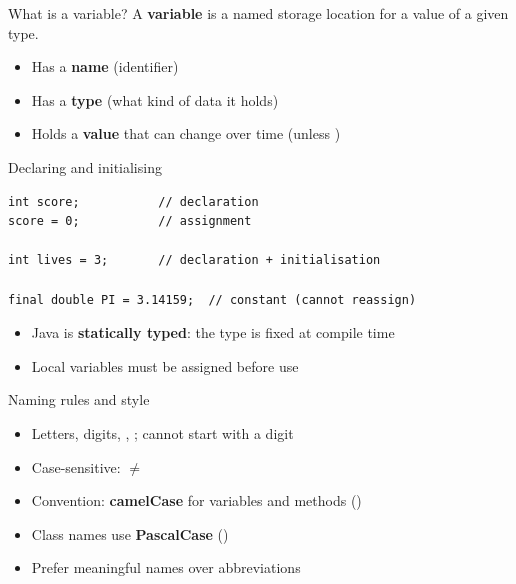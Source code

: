 \documentclass[aspectratio=169,11pt]{beamer}
\begin{document}
    \begin{frame}{What is a variable?}
        A \textbf{variable} is a named storage location for a value of a given type.
        \vspace{0.6em}
        \begin{itemize}
            \item Has a \textbf{name} (identifier)
            \item Has a \textbf{type} (what kind of data it holds)
            \item Holds a \textbf{value} that can change over time (unless )
        \end{itemize}
    \end{frame}

    \begin{frame}[fragile]{Declaring and initialising}
        \begin{lstlisting}
int score;           // declaration
score = 0;           // assignment

int lives = 3;       // declaration + initialisation

final double PI = 3.14159;  // constant (cannot reassign)
        \end{lstlisting}
        \vspace{0.4em}
        \begin{itemize}
            \item Java is \textbf{statically typed}: the type is fixed at compile time
            \item Local variables must be assigned before use
        \end{itemize}
    \end{frame}

    \begin{frame}{Naming rules and style}
        \begin{itemize}
            \item Letters, digits, \javacode{\_}, \javacode{\$}; cannot start with a digit
            \item Case-sensitive:  $\neq$ 
            \item Convention: \textbf{camelCase} for variables and methods ()
            \item Class names use \textbf{PascalCase} ()
            \item Prefer meaningful names over abbreviations
        \end{itemize}
        \vspace{0.4em}
    \end{frame}
\end{document}
